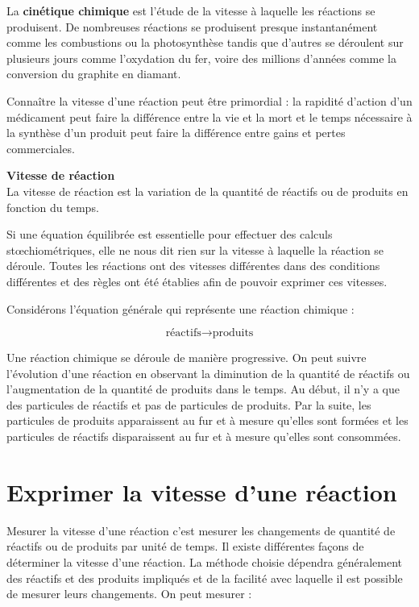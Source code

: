 \documentclass[
  11pt,
  a4paper,
  openany]{book}
\begin{document}
La \textbf{cinétique chimique} est l'étude de la vitesse à laquelle les réactions se produisent. De nombreuses réactions se produisent presque instantanément comme les combustions ou la photosynthèse tandis que d'autres se déroulent sur plusieurs jours comme l'oxydation du fer, voire des millions d'années comme la conversion du graphite en diamant.

Connaître la vitesse d'une réaction peut être primordial : la rapidité d'action d'un médicament peut faire la différence entre la vie et la mort et le temps nécessaire à la synthèse d'un produit peut faire la différence entre gains et pertes commerciales.

\begin{tcolorbox}
\textbf{Vitesse de réaction}\\
La vitesse de réaction est la variation de la quantité de réactifs ou de produits en fonction du temps.

\end{tcolorbox}

Si une équation équilibrée est essentielle pour effectuer des calculs stœchiométriques, elle ne nous dit rien sur la vitesse à laquelle la réaction se déroule. Toutes les réactions ont des vitesses différentes dans des conditions différentes et des règles ont été établies afin de pouvoir exprimer ces vitesses.

Considérons l'équation générale qui représente une réaction chimique :

\[
\text{réactifs} \rightarrow \text{produits}
\]

Une réaction chimique se déroule de manière progressive. On peut suivre l'évolution d'une réaction en observant la diminution de la quantité de réactifs ou l'augmentation de la quantité de produits dans le temps. Au début, il n'y a que des particules de réactifs et pas de particules de produits. Par la suite, les particules de produits apparaissent au fur et à mesure qu'elles sont formées et les particules de réactifs disparaissent au fur et à mesure qu'elles sont consommées.

\section{Exprimer la vitesse d'une réaction}\label{exprimer-la-vitesse-dune-ruxe9action}

Mesurer la vitesse d'une réaction c'est mesurer les changements de quantité de réactifs ou de produits par unité de temps. Il existe différentes façons de déterminer la vitesse d'une réaction. La méthode choisie dépendra généralement des réactifs et des produits impliqués et de la facilité avec laquelle il est possible de mesurer leurs changements. On peut mesurer :
\end{document}
